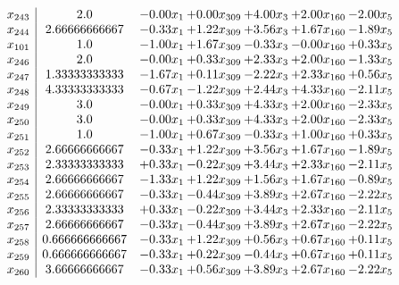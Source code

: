 \documentclass[8pt]{article}
\begin{document}
\[\begin{array}{c| c c@{\hskip 2pt} c@{\hskip 2pt} c@{\hskip 2pt} c@{\hskip 2pt} c@{\hskip 2pt} }
 x_{243}   &  2.0 & -0.00 x_{1} & +  0.00 x_{309} & +  4.00 x_{3} & +  2.00 x_{160} & -2.00 x_{5}\\
 x_{244}   &  2.66666666667 & -0.33 x_{1} & +  1.22 x_{309} & +  3.56 x_{3} & +  1.67 x_{160} & -1.89 x_{5}\\
 x_{101}   &  1.0 & -1.00 x_{1} & +  1.67 x_{309} & -0.33 x_{3} & -0.00 x_{160} & +  0.33 x_{5}\\
 x_{246}   &  2.0 & -0.00 x_{1} & +  0.33 x_{309} & +  2.33 x_{3} & +  2.00 x_{160} & -1.33 x_{5}\\
 x_{247}   &  1.33333333333 & -1.67 x_{1} & +  0.11 x_{309} & -2.22 x_{3} & +  2.33 x_{160} & +  0.56 x_{5}\\
 x_{248}   &  4.33333333333 & -0.67 x_{1} & -1.22 x_{309} & +  2.44 x_{3} & +  4.33 x_{160} & -2.11 x_{5}\\
 x_{249}   &  3.0 & -0.00 x_{1} & +  0.33 x_{309} & +  4.33 x_{3} & +  2.00 x_{160} & -2.33 x_{5}\\
 x_{250}   &  3.0 & -0.00 x_{1} & +  0.33 x_{309} & +  4.33 x_{3} & +  2.00 x_{160} & -2.33 x_{5}\\
 x_{251}   &  1.0 & -1.00 x_{1} & +  0.67 x_{309} & -0.33 x_{3} & +  1.00 x_{160} & +  0.33 x_{5}\\
 x_{252}   &  2.66666666667 & -0.33 x_{1} & +  1.22 x_{309} & +  3.56 x_{3} & +  1.67 x_{160} & -1.89 x_{5}\\
 x_{253}   &  2.33333333333 & +  0.33 x_{1} & -0.22 x_{309} & +  3.44 x_{3} & +  2.33 x_{160} & -2.11 x_{5}\\
 x_{254}   &  2.66666666667 & -1.33 x_{1} & +  1.22 x_{309} & +  1.56 x_{3} & +  1.67 x_{160} & -0.89 x_{5}\\
 x_{255}   &  2.66666666667 & -0.33 x_{1} & -0.44 x_{309} & +  3.89 x_{3} & +  2.67 x_{160} & -2.22 x_{5}\\
 x_{256}   &  2.33333333333 & +  0.33 x_{1} & -0.22 x_{309} & +  3.44 x_{3} & +  2.33 x_{160} & -2.11 x_{5}\\
 x_{257}   &  2.66666666667 & -0.33 x_{1} & -0.44 x_{309} & +  3.89 x_{3} & +  2.67 x_{160} & -2.22 x_{5}\\
 x_{258}   &  0.666666666667 & -0.33 x_{1} & +  1.22 x_{309} & +  0.56 x_{3} & +  0.67 x_{160} & +  0.11 x_{5}\\
 x_{259}   &  0.666666666667 & -0.33 x_{1} & +  0.22 x_{309} & -0.44 x_{3} & +  0.67 x_{160} & +  0.11 x_{5}\\
 x_{260}   &  3.66666666667 & -0.33 x_{1} & +  0.56 x_{309} & +  3.89 x_{3} & +  2.67 x_{160} & -2.22 x_{5}\\

\end{array}\]
\end{document}
